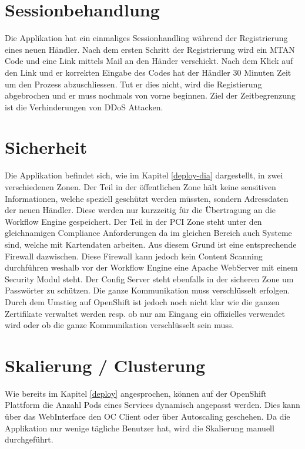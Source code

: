\section{Sessionbehandlung}

Die Applikation hat ein einmaliges Sessionhandling während der Registrierung eines neuen Händler. Nach dem ersten Schritt der Registrierung wird ein MTAN Code und eine Link mittels Mail an den Händer verschickt. Nach dem Klick auf den Link und er korrekten Eingabe des Codes hat der Händler 30 Minuten Zeit um den Prozess abzuschliessen.
Tut er dies nicht, wird die Registierung abgebrochen und er muss nochmals von vorne beginnen. Ziel der Zeitbegrenzung ist die Verhinderungen von \Gls{DDoS} Attacken.

\section{Sicherheit}

Die Applikation befindet sich, wie im Kapitel \ref{deploy-dia} dargestellt, in zwei verschiedenen Zonen. Der Teil in der öffentlichen Zone hält keine sensitiven Informationen, welche speziell geschützt werden müssten, sondern Adressdaten der neuen Händler. Diese werden nur kurzzeitig für die Übertragung an die Workflow Engine gespeichert. Der Teil in der PCI Zone steht unter den gleichnamigen Compliance Anforderungen da im gleichen Bereich auch Systeme sind, welche mit Kartendaten arbeiten. Aus diesem Grund ist eine entsprechende Firewall dazwischen. Diese Firewall kann jedoch kein Content Scanning durchführen weshalb vor der Workflow Engine eine Apache WebServer mit einem Security Modul steht. Der Config Server steht ebenfalls in der sicheren Zone um Passwörter zu schützen. Die ganze Kommunikation muss verschlüsselt erfolgen. Durch dem Umstieg auf OpenShift ist jedoch noch nicht klar wie die ganzen Zertifikate verwaltet werden resp. ob nur am Eingang ein offizielles verwendet wird oder ob die ganze Kommunikation verschlüsselt sein muss.

\section{Skalierung / Clusterung}

Wie bereits im Kapitel \ref{deploy} angesprochen, können auf der OpenShift Plattform die Anzahl Pods eines Services dynamisch angepasst werden. Dies kann über das WebInterface den OC Client oder über Autoscaling geschehen. Da die Applikation nur wenige tägliche Benutzer hat, wird die Skalierung manuell durchgeführt.

